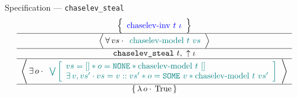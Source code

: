 \begin{frame}{Specification --- \texttt{chaselev\_steal}}
\footnotesize
\centering
\[
	\atripleExtPretty{
		\tikz[baseline, remember picture]{\node[anchor=base] (inv_1) {${
			\textcolor{blue}{\mathrm{chaselev \mathhyphen inv}\ t\ \iota}
		}$}}
	}{
		vs
	}{
		\tikz[baseline, remember picture]{\node[anchor=base] (model_1) {${
			\textcolor{teal}{\mathrm{chaselev \mathhyphen model}\ t\ vs}
		}$}}
	}{
		\texttt{chaselev\_steal}\ t
	}{
		\uparrow\iota
	}{
		o
	}{
		\tikz[baseline, remember picture]{\node[anchor=base] (model_2) {${
			\textcolor{teal}{
				\bigvee\left[\begin{array}{l}
						vs = [] \iSep
						o = \exprNone \iSep
						\mathrm{chaselev \mathhyphen model}\ t\ []
					\\
						\exists v, vs' \cdot
						vs = v :: vs' \iSep
						o = \exprSome{v} \iSep
						\mathrm{chaselev \mathhyphen model}\ t\ vs'
				\end{array}\right]
			}
		}$}}
	}{
		o
	}{
		\iTrue
	}
\]
\vfill
{}
\end{frame}